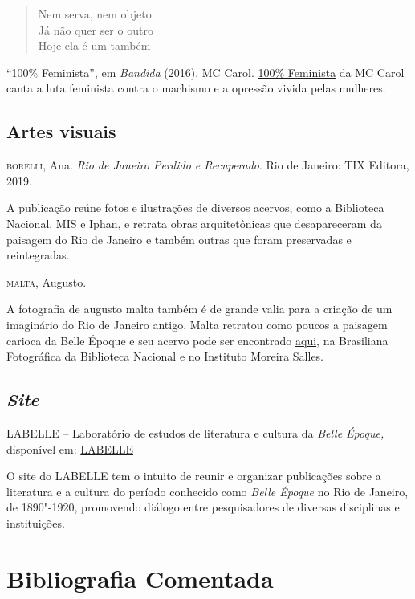 \documentclass[12pt]{extarticle}
\begin{document}
\begin{verse}
Nem serva, nem objeto\\
Já não quer ser o outro\\
Hoje ela é um também\\
\end{verse}

``100\% Feminista'', em \emph{Bandida} (2016), MC Carol.
\href{https://www.youtube.com/watch?v=W05v0B59K5s&ab_channel=McCarolOficial}{100\% Feminista} da MC Carol canta a luta feminista 
contra o machismo e a opressão vivida pelas mulheres. 

\subsection{Artes visuais}

\textsc{borelli}, Ana. \emph{Rio de Janeiro Perdido e Recuperado}. Rio de Janeiro: TIX
Editora, 2019.

A publicação reúne fotos e ilustrações de diversos acervos, como a Biblioteca Nacional, 
MIS e Iphan, e retrata obras arquitetônicas que desapareceram da paisagem do Rio de 
Janeiro e também outras que foram preservadas e reintegradas.

\textsc{malta}, Augusto.

A fotografia de augusto malta também é de grande valia para a criação de um imaginário 
do Rio de Janeiro antigo. Malta retratou como poucos a paisagem carioca da Belle Époque 
e seu acervo pode ser encontrado \href{http://brasilianafotografica.bn.br/?tag=augusto-malta}{aqui}, na Brasiliana Fotográfica da
Biblioteca Nacional e no Instituto Moreira Salles.

\subsection{\emph{Site}}

LABELLE -- Laboratório de estudos de literatura e cultura da \emph{Belle Époque,} 
disponível em: \href{http://labelleuerj.com.br/}{LABELLE}

O site do LABELLE tem o intuito de reunir e organizar publicações sobre a literatura 
e a cultura do período conhecido como \emph{Belle Époque} no Rio de Janeiro, de 1890"-1920, 
promovendo diálogo entre pesquisadores de diversas disciplinas e instituições.

\section{Bibliografia Comentada}
\end{document}
